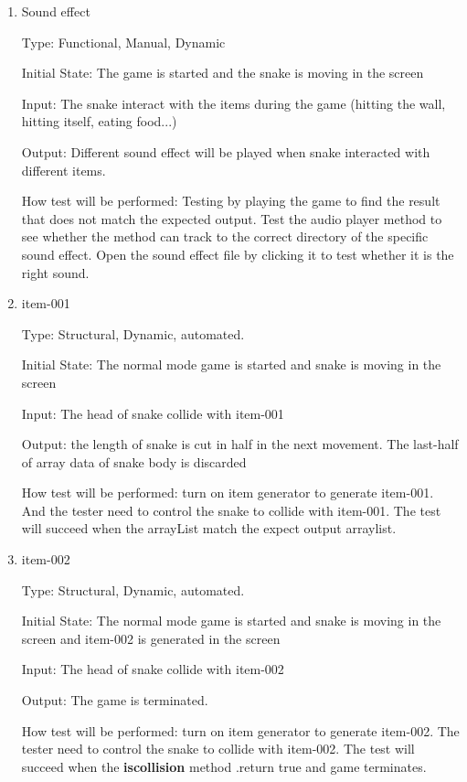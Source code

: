 \documentclass[12pt, titlepage]{article}
\begin{document}
\begin{enumerate}

\item{Sound effect\\}

Type: Functional, Manual, Dynamic
					
Initial State: The game is started and the snake is moving in the screen
					
Input: The snake interact with the items during the game (hitting the wall, hitting itself, eating food...)
					
Output: Different sound effect will be played when snake interacted with different items.
					
How test will be performed: Testing by playing the game to find the result that does not match the expected output. Test the audio player method to see whether the method can track to the correct directory of the specific sound effect.
Open the sound effect file by clicking it to test whether it is the right sound.
					
\item{item-001\\}

Type: Structural, Dynamic, automated.
					
Initial State: The normal mode game is started and snake is moving in the screen
					
Input: The head of snake collide with item-001
					
Output: the length of snake is cut in half in the next movement. The last-half of array data of snake body is discarded
					
How test will be performed: turn on item generator to generate item-001. And the tester need to control the snake to collide with item-001. The test will succeed when the arrayList match the expect output arraylist.

\item{item-002\\}

Type: Structural, Dynamic, automated.
					
Initial State: The normal mode game is started and snake is moving in the screen and item-002 is generated in the screen
					
Input: The head of snake collide with item-002
					
Output: The game is terminated.
					
How test will be performed: turn on item generator to generate item-002. The tester need to control the snake to collide with item-002. The test will succeed when the \textbf{iscollision} method .return true and game terminates.


\end{enumerate}
\end{document}
